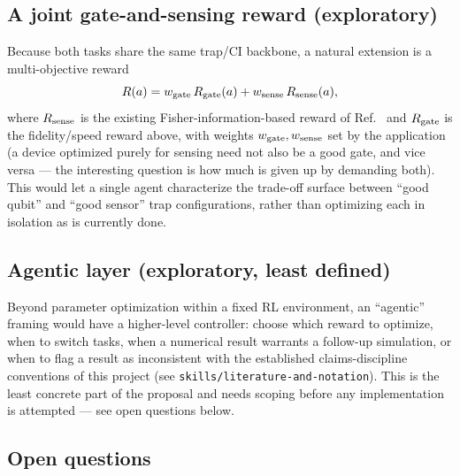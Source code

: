 \documentclass[aps,prapplied,reprint,superscriptaddress,longbibliography]{revtex4-2}
\begin{document}
\subsection{A joint gate-and-sensing reward (exploratory)}

Because both tasks share the same trap/CI backbone, a natural extension is a multi-objective reward
\begin{equation}
R(a) = w_{\rm gate}\, R_{\rm gate}(a) + w_{\rm sense}\, R_{\rm sense}(a),
\end{equation}
where $R_{\rm sense}$ is the existing Fisher-information-based reward of
Ref.~\cite{perruzza2026} and $R_{\rm gate}$ is the fidelity/speed reward above, with weights
$w_{\rm gate}, w_{\rm sense}$ set by the application (a device optimized purely for sensing need not
also be a good gate, and vice versa — the interesting question is how much is given up by demanding
both). This would let a single agent characterize the trade-off surface between ``good qubit'' and
``good sensor'' trap configurations, rather than optimizing each in isolation as is currently done.

\subsection{Agentic layer (exploratory, least defined)}

Beyond parameter optimization within a fixed RL environment, an ``agentic'' framing would have a
higher-level controller: choose which reward to optimize, when to switch tasks, when a numerical
result warrants a follow-up simulation, or when to flag a result as inconsistent with the
established claims-discipline conventions of this project (see
\texttt{skills/literature-and-notation}). This is the least concrete part of the proposal and
needs scoping before any implementation is attempted — see open questions below.

\subsection{Open questions}
\end{document}
